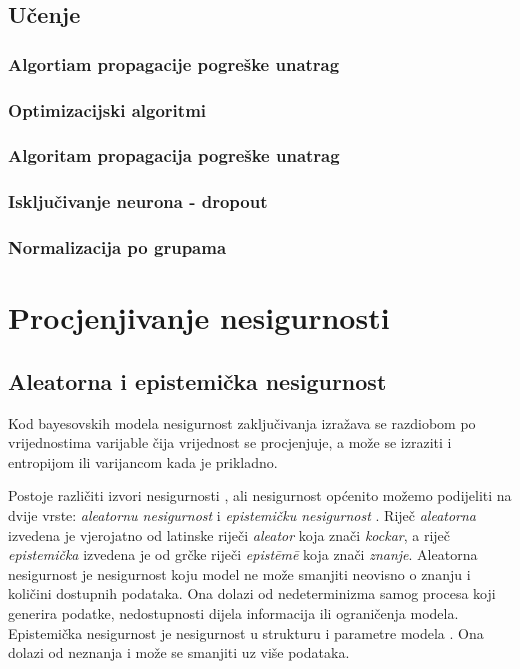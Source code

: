 \documentclass[utf8, diplomski, lmodern]{fer}
\begin{document}
\section{Učenje} \label{sec:du-ucenje}

\subsection{Algortiam propagacije pogreške unatrag}

\subsection{Optimizacijski algoritmi} \label{subsec:dukn-u-optimizacijski-algoritmi}

\subsection{Algoritam propagacija pogreške unatrag}

\subsection{Isključivanje neurona - dropout}

\subsection{Normalizacija po grupama}



\chapter{Procjenjivanje nesigurnosti}


\section{Aleatorna i epistemička nesigurnost}

Kod bayesovskih modela nesigurnost zaključivanja izražava se razdiobom po vrijednostima varijable čija vrijednost se procjenjuje, a može se izraziti i entropijom ili varijancom kada je prikladno.

Postoje različiti izvori nesigurnosti \citep{Kennedy:2002:BCCM}, ali nesigurnost općenito možemo podijeliti na dvije vrste: \emph{aleatornu nesigurnost} i \emph{epistemičku nesigurnost} \citep{Kiureghian:2009:AEDM}. Riječ \textit{aleatorna} izvedena je vjerojatno od latinske riječi \textit{aleator} \citep{Gal:2016:UDL} koja znači \textit{kockar}, a riječ \textit{epistemička} izvedena je od grčke riječi \textit{epist\={e}m\={e}} koja znači \textit{znanje}. Aleatorna nesigurnost je nesigurnost koju model ne može smanjiti neovisno o znanju i količini dostupnih podataka. Ona dolazi od nedeterminizma samog procesa koji generira podatke, nedostupnosti dijela informacija ili ograničenja modela. Epistemička nesigurnost je nesigurnost u strukturu i parametre modela \citep{Gal:2016:UDL}. Ona dolazi od neznanja i može se smanjiti uz više podataka.
\end{document}
